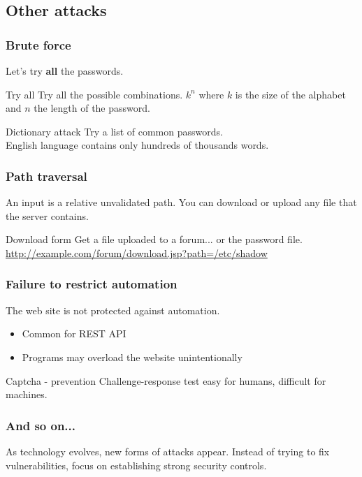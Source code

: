 \subsection{Other attacks}

\begin{frame}
\frametitle{Brute force}
Let's try \textbf{all} the passwords.
\begin{block}{Try all}
Try all the possible combinations.
\newline
$k^n$ where $k$ is the size of the alphabet and $n$ the length of the
password.
\end{block}
\begin{block}{Dictionary attack}
Try a list of common passwords.
\\ English language contains only hundreds of thousands words.
\end{block}
\end{frame}


\begin{frame}
\frametitle{Path traversal}
An input is a relative unvalidated path.
You can download or upload any file that the server contains.
\begin{exampleblock}{Download form}
Get a file uploaded to a forum... or the password file.
\newline
\url{http://example.com/forum/download.jsp?path=/etc/shadow}
\end{exampleblock}
\end{frame}

\begin{frame}
\frametitle{Failure to restrict automation}
The web site is not protected against automation.
\begin{itemize}
\item Common for REST API
\item Programs may overload the website unintentionally
\end{itemize}
\begin{exampleblock}{Captcha - prevention}
Challenge-response test easy for humans, difficult for machines.
\end{exampleblock}
\end{frame}

\begin{frame}
\frametitle{And so on...}
As technology evolves, new forms of attacks appear.
Instead of trying to fix vulnerabilities, focus on establishing strong
security controls.
\end{frame}

